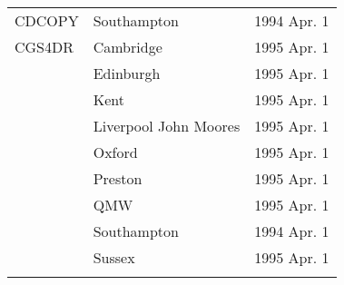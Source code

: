 \begin{table}
\begin{center}
\begin{tabular}{|p{36mm}|p{50mm}|p{30mm}|}
CDCOPY                  & Southampton      & 1994 Apr. 1 \\
CGS4DR                  & Cambridge        & 1995 Apr. 1 \\
                        & Edinburgh        & 1995 Apr. 1 \\
                        & Kent             & 1995 Apr. 1 \\
                        & Liverpool John Moores & 1995 Apr. 1 \\
                        & Oxford           & 1995 Apr. 1 \\
                        & Preston          & 1995 Apr. 1 \\
                        & QMW              & 1995 Apr. 1 \\
                        & Southampton      & 1994 Apr. 1 \\
                        & Sussex           & 1995 Apr. 1 \\
& & \\ \hline                   
\end{tabular}
\end{center}
\end{table}


